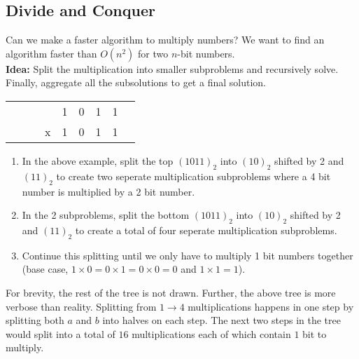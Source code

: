 \documentclass[14pt]{extarticle}
\begin{document}
    \pagebreak
    \subsection{Divide and Conquer}
    Can we make a faster algorithm to multiply numbers? We want to find an
    algorithm faster than $O(n^2)$ for two $n$-bit numbers.\\

    \textbf{Idea:} Split the multiplication into smaller subproblems
    and recursively solve. Finally, aggregate all the subsolutions to get
    a final solution.
    \begin{center}
        \begin{tabular}{ccccccccc}
            & & & & 1 & 0 & 1 & 1           \\
            & & & x & 1 & 0 & 1 & 1         \\
            \hline
        \end{tabular}
    \end{center}
    \begin{enumerate}
        \item In the above example, split the top $(1011)_2$ into $(10)_2$
            shifted by 2 and $(11)_2$ to create two seperate multiplication
            subproblems where a 4 bit number is multiplied by a 2 bit number.
        \item In the 2 subproblems, split the bottom $(1011)_2$ into $(10)_2$
            shifted by 2 and $(11)_2$ to create a total of four seperate
            multiplication subproblems.
        \item Continue this splitting until we only have to multiply 1 bit
            numbers together (base case, $1\times 0 = 0\times 1 = 0\times 0
            = 0$ and $1\times 1 = 1$).
    \end{enumerate}
    \begin{center}
    \end{center}
    For brevity, the rest of the tree is not drawn. Further, the above tree
    is more verbose than reality. Splitting from $1 \to 4$ multiplications
    happens in one step by splitting both $a$ and $b$ into halves on each
    step. The next two steps in the tree would split into a total of $16$ 
    multiplications each of which contain $1$ bit to multiply.\\
\end{document}
